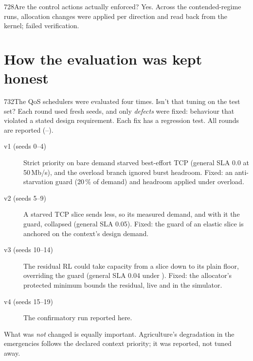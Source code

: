 \begin{qa}{728}{Are the control actions actually enforced?}
Yes. Across the \NQRuns{} contended-regime runs, \NQChangesApplied{} allocation changes were applied per direction and
read back from the kernel; \NQEnforcementFailed{} failed verification.
\end{qa}

\section{How the evaluation was kept honest}

\begin{qa}{732}{The QoS schedulers were evaluated four times. Isn't that tuning on the test set?}
Each round used fresh seeds, and only \emph{defects} were fixed: behaviour that violated a stated design requirement.
Each fix has a regression test. All rounds are reported (--).
\begin{description}
\item[v1 (seeds 0--4)] Strict priority on bare demand starved best-effort TCP (general SLA 0.0 at 50\,Mb/s), and the
overload branch ignored burst headroom. Fixed: an anti-starvation guard (20\,\% of demand) and headroom applied under
overload.
\item[v2 (seeds 5--9)] A starved TCP slice sends less, so its measured demand, and with it the guard, collapsed
(general SLA 0.05). Fixed: the guard of an elastic slice is anchored on the context's design demand.
\item[v3 (seeds 10--14)] The residual RL could take capacity from a slice down to its plain floor, overriding the
guard (general SLA 0.04 under ). Fixed: the allocator's protected minimum bounds the residual, live
and in the simulator.
\item[v4 (seeds 15--19)] The confirmatory run reported here.
\end{description}
What was \emph{not} changed is equally important. Agriculture's degradation in the emergencies follows the declared
context priority; it was reported, not tuned away.
\end{qa}

